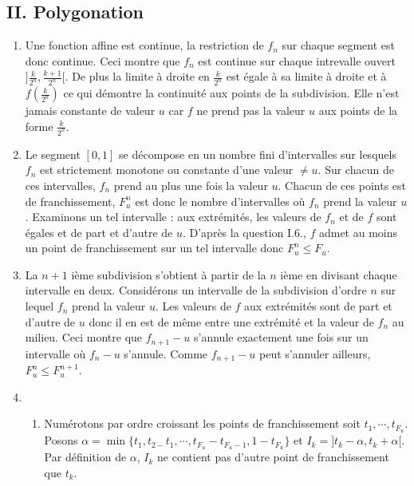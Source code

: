 \subsection*{II. Polygonation}
\begin{enumerate}
 \item Une fonction affine est continue, la restriction de $f_{n}$ sur chaque segment est donc continue. Ceci montre que $f_{n}$ est
continue sur chaque intrevalle ouvert $]\frac{k}{2^{n}},\frac{k+1}{2^{n}}[ $. De plus la limite {\`a} droite en $\frac{k}{2^{n}}$ est {\'e}gale {\`a} sa limite {\`a}
droite et {\`a} $f(\frac{k}{2^{n}})$ ce qui d{\'e}montre la continuit{\'e} aux points de la subdivision. Elle n'est jamais constante de valeur $u$ car $f$ ne prend pas la valeur $u$ aux points de la forme $\frac{k}{2^{n}}$.

  \item Le segment $[ 0,1] $ se d{\'e}compose en un nombre fini d'intervalles sur lesquels $f_{n}$ est strictement monotone ou
constante d'une valeur $\neq u$. Sur chacun de ces intervalles, $f_{n}$ prend au plus une fois la valeur $u$. Chacun de ces points est de franchissement, $F_{u}^{n}$ est donc le nombre d'intervalles o{\`u} $f_{n}$ prend la valeur $u $.\newline
Examinons un tel intervalle : aux extr{\'e}mit{\'e}s, les valeurs de $f_{n}$ et de $f$ sont {\'e}gales et de part et d'autre de $u$.
D'apr{\`e}s la question I.6., $f$ admet au moins un point de franchissement sur un tel intervalle donc $F_{u}^{n}\leq F_{u}$.

  \item La $n+1$ i{\`e}me subdivision s'obtient {\`a} partir de la $n$ i{\`e}me en divisant chaque intervalle en deux.
Consid{\'e}rons un intervalle de la subdivision d'ordre $n$ sur lequel $f_{n}$ prend la valeur $u$. Les valeurs de $f$ aux extr{\'e}mit{\'e}s sont de part et d'autre de
$u$ donc il en est de m{\^e}me entre une extr{\'e}mit{\'e} et la valeur de $f_{n} $ au milieu. Ceci montre que $f_{n+1}-u$ s'annule exactement une fois sur un intervalle o{\`u} $f_{n}-u$ s'annule.
Comme $f_{n+1}-u$ peut s'annuler ailleurs, $F_{u}^{n}\leq F_{u}^{n+1}$.

  \item
  \begin{enumerate}
    \item Num{\'e}rotons par ordre croissant les points de franchissement soit $t_{1},\cdots ,t_{F_{u}}$.
Posons $\alpha =\min \{t_{1},t_{2-}t_{1},\cdots ,t_{F_{u}}-t_{F_{u}-1},1-t_{F_{u}}\} $ et
$I_{k}=] t_{k}-\alpha ,t_{k}+\alpha [ $.
Par d{\'e}finition de $\alpha $, $I_{k}$ ne contient pas d'autre point de franchissement que $t_{k}$.


\end{enumerate}
\end{enumerate}
